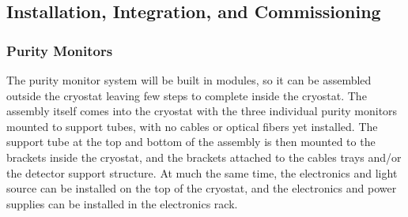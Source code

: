 



\subsection{Installation, Integration, and Commissioning}


\subsubsection{Purity Monitors}
\label{sec:fdgen-slow-cryo-install-pm}


The purity monitor system will be built in modules, so it can be assembled outside the %
cryostat  
leaving few steps to complete inside the cryostat.  The assembly itself %
 comes into the cryostat with the three individual purity monitors mounted to support tubes, with no  cables or optical fibers yet installed.  The support tube at the top and bottom of the assembly %
 is then mounted to the brackets inside the cryostat, and  %
 the brackets attached to the cables trays and/or the detector support structure.  At much the same time, the  electronics and light source can be installed on the top of the cryostat, and the electronics and power supplies can be installed in the electronics rack.  

